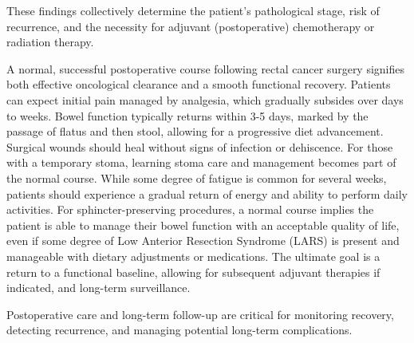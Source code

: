 These findings collectively determine the patient's pathological stage, risk of recurrence, and the necessity for adjuvant (postoperative) chemotherapy or radiation therapy.

A normal, successful postoperative course following rectal cancer surgery signifies both effective oncological clearance and a smooth functional recovery. Patients can expect initial pain managed by analgesia, which gradually subsides over days to weeks. Bowel function typically returns within 3-5 days, marked by the passage of flatus and then stool, allowing for a progressive diet advancement. Surgical wounds should heal without signs of infection or dehiscence. For those with a temporary stoma, learning stoma care and management becomes part of the normal course. While some degree of fatigue is common for several weeks, patients should experience a gradual return of energy and ability to perform daily activities. For sphincter-preserving procedures, a normal course implies the patient is able to manage their bowel function with an acceptable quality of life, even if some degree of Low Anterior Resection Syndrome (LARS) is present and manageable with dietary adjustments or medications. The ultimate goal is a return to a functional baseline, allowing for subsequent adjuvant therapies if indicated, and long-term surveillance.

Postoperative care and long-term follow-up are critical for monitoring recovery, detecting recurrence, and managing potential long-term complications.

